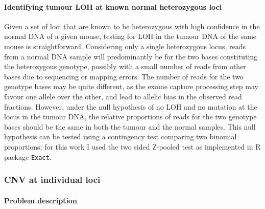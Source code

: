 \documentclass[thesis.tex]{subfiles}
\begin{document}
\paragraph{Identifying tumour \acrshort{LOH} at known normal heterozygous loci}

Given a set of loci that are known to be heterozygous with high confidence in the normal DNA of a given mouse, testing for \gls{LOH} in the tumour DNA of the same mouse is straightforward.  Considering only a single heterozygous locus, reads from a normal DNA sample will predominantly be for the two bases constituting the heterozygous genotype, possibly with a small number of reads from other bases due to sequencing or mapping errors.  The number of reads for the two genotype bases may be quite different, as the exome capture processing step may favour one allele over the other, and lead to allelic bias in the observed read fractions.  However, under the null hypothesis of no LOH and no mutation at the locus in the tumour DNA, the relative proportions of reads for the two genotype bases should be the same in both the tumour and the normal samples.  This null hypothesis can be tested using a contingency test comparing two binomial proportions; for this work I used the two sided Z-pooled test as implemented in R package \lstinline|Exact|.  



\subsubsection{\Acrlong{CNV} at individual loci}

\paragraph{Problem description}
\end{document}
